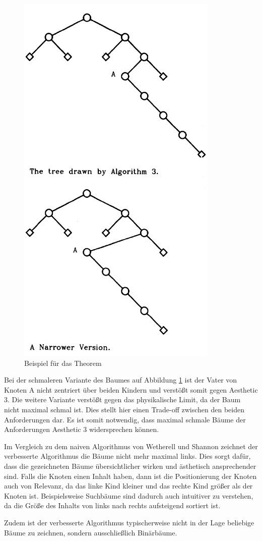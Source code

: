 \begin{figure}[H]
    \centering
    \includegraphics[scale = 0.75]{abbildungen/baum_theorem_uglification}
    \caption{Beispiel für das Theorem \cite[S. 519]{q1}}
    \label{pic:baum_theorem_uglification} 
\end{figure}

Bei der schmaleren Variante des Baumes auf Abbildung \ref{pic:baum_theorem_uglification} ist der Vater von Knoten A nicht zentriert
über beiden Kindern und verstößt somit gegen Aesthetic 3. Die weitere Variante verstößt gegen das physikalische Limit, da der Baum nicht
maximal schmal ist. Dies stellt hier einen Trade-off zwischen den beiden Anforderungen dar. Es ist somit notwendig, dass maximal schmale Bäume der
Anforderungen Aesthetic 3 widersprechen können. 

Im Vergleich zu dem naiven Algorithmus von Wetherell und Shannon zeichnet der verbesserte Algorithmus die Bäume nicht mehr maximal links.
Dies sorgt dafür, dass die gezeichneten Bäume übersichtlicher wirken und ästhetisch ansprechender sind. Falls die Knoten einen Inhalt haben, dann
ist die Positionierung der Knoten auch von Relevanz, da das linke Kind kleiner und das rechte Kind größer als der Knoten ist. Beispielsweise
Suchbäume sind dadurch auch intuitiver zu verstehen, da die Größe des Inhalts von links nach rechts aufsteigend sortiert ist. 

Zudem ist der verbesserte Algorithmus typischerweise nicht in der Lage beliebige Bäume zu zeichnen, sondern ausschließlich Binärbäume.
